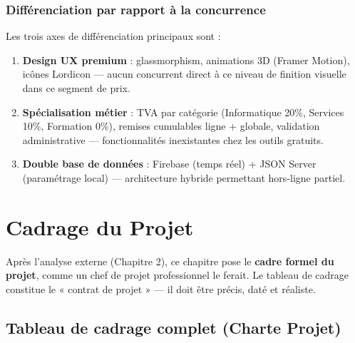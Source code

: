 \documentclass[12pt,a4paper]{report}
\begin{document}
\begin{center}
\end{center}

\subsection{Différenciation par rapport à la concurrence}

Les trois axes de différenciation principaux sont :
\begin{enumerate}
    \item \textbf{Design UX premium} : glassmorphism, animations 3D (Framer Motion), icônes Lordicon — aucun concurrent direct à ce niveau de finition visuelle dans ce segment de prix.
    \item \textbf{Spécialisation métier} : TVA par catégorie (Informatique 20\%, Services 10\%, Formation 0\%), remises cumulables ligne + globale, validation administrative — fonctionnalités inexistantes chez les outils gratuits.
    \item \textbf{Double base de données} : Firebase (temps réel) + JSON Server (paramétrage local) — architecture hybride permettant hors-ligne partiel.
\end{enumerate}

\chapter{Cadrage du Projet}

Après l'analyse externe (Chapitre 2), ce chapitre pose le \textbf{cadre formel du projet}, comme un chef de projet professionnel le ferait. Le tableau de cadrage constitue le « contrat de projet » — il doit être précis, daté et réaliste.

\section{Tableau de cadrage complet (Charte Projet)}
\end{document}
